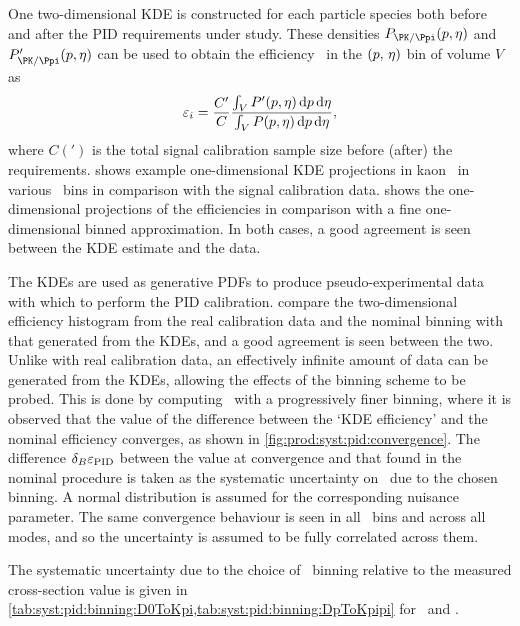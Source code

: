 One two-dimensional \ac{KDE} is constructed for each particle species both 
before and after the \ac{PID} requirements under study.
These densities $P_{\PK/\Ppi}(\ptot, \Eta)$ and $P'_{\PK/\Ppi}(\ptot, \Eta)$
can be used to obtain the efficiency \effi\ in the $(p,\,\eta)$ bin of 
volume $V$ as
\begin{equation}
  \effi = \frac{C'}{C}\frac{%
    \int_{V} P'(\ptot,\Eta)\dif{p}\dif{\Eta}
  }{%
    \int_{V} P(\ptot,\Eta)\dif{p}\dif{\Eta}
  },
\end{equation}
where $C(')$ is the total signal calibration sample size before (after) the 
requirements.
 shows example one-dimensional \ac{KDE} 
projections in kaon \Eta\ in various \ptot\ bins in comparison with the signal 
calibration data.
 shows the one-dimensional projections 
of the efficiencies in comparison with a fine one-dimensional binned 
approximation.
In both cases, a good agreement is seen between the \ac{KDE} estimate and the 
data.

The \acp{KDE} are used as generative \acp{PDF} to produce pseudo-experimental 
data with which to perform the \ac{PID} calibration.
compare the two-dimensional efficiency histogram from the real calibration data 
and the nominal binning with that generated from the \acp{KDE}, and a good 
agreement is seen between the two.
Unlike with real calibration data, an effectively infinite amount of data can 
be generated from the \acp{KDE}, allowing the effects of the binning scheme to 
be probed.
This is done by computing \effpid\ with a progressively finer binning, where it 
is observed that the value of the difference between the `\ac{KDE} efficiency' 
and the nominal efficiency converges, as shown in 
\cref{fig:prod:syst:pid:convergence}.
The difference $\delta_{B}{\varepsilon_{\textnormal{PID}}}$ between the value at convergence and that 
found in the nominal procedure is taken as the systematic uncertainty on 
\effpid\ due to the chosen binning.
A normal distribution is assumed for the corresponding nuisance parameter.
The same convergence behaviour is seen in all \pTy\ bins and across all modes, 
and so the uncertainty is assumed to be fully correlated across them.

The systematic uncertainty due to the choice of \ptotetanspd\ binning relative 
to the measured cross-section value is given in 
\cref{tab:syst:pid:binning:D0ToKpi,tab:syst:pid:binning:DpToKpipi} for 
\DzToKpi\ and \DpToKpipi.

